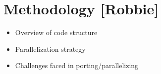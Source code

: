 \section{Methodology [Robbie]}
\begin{itemize}
  \item Overview of code structure
  \item Parallelization strategy
  \item Challenges faced in porting/parallelizing
\end{itemize}
